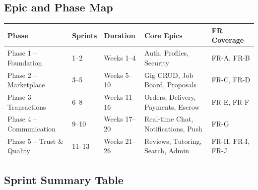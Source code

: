 \documentclass[a4paper,12pt]{article}
\begin{document}
\subsection{Epic and Phase Map}

\begin{table}[H]
\centering
\small
\begin{tabular}{|l|l|l|l|l|}
\hline
\textbf{Phase} & \textbf{Sprints} & \textbf{Duration} & \textbf{Core Epics} & \textbf{FR Coverage} \\
\hline
Phase 1 -- Foundation & 1--2 & Weeks 1--4 & Auth, Profiles, Security & FR-A, FR-B \\
Phase 2 -- Marketplace & 3--5 & Weeks 5--10 & Gig CRUD, Job Board, Proposals & FR-C, FR-D \\
Phase 3 -- Transactions & 6--8 & Weeks 11--16 & Orders, Delivery, Payments, Escrow & FR-E, FR-F \\
Phase 4 -- Communication & 9--10 & Weeks 17--20 & Real-time Chat, Notifications, Push & FR-G \\
Phase 5 -- Trust \& Quality & 11--13 & Weeks 21--26 & Reviews, Tutoring, Search, Admin & FR-H, FR-I, FR-J \\
\hline
\end{tabular}
\end{table}

\subsection{Sprint Summary Table}
\end{document}

